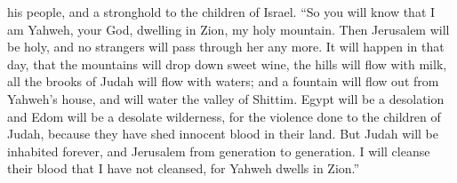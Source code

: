 his people, and a stronghold to the children of Israel. 
``So you will know that I am Yahweh, your God, dwelling in Zion, my holy
mountain. Then Jerusalem will be holy, and no strangers will pass
through her any more.  It will happen in that day, that
the mountains will drop down sweet wine, the hills will flow with milk,
all the brooks of Judah will flow with waters; and a fountain will flow
out from Yahweh's house, and will water the valley of Shittim.
 Egypt will be a desolation and Edom will be a desolate
wilderness, for the violence done to the children of Judah, because they
have shed innocent blood in their land.  But Judah will
be inhabited forever, and Jerusalem from generation to generation.
 I will cleanse their blood that I have not cleansed, for
Yahweh dwells in Zion.''
